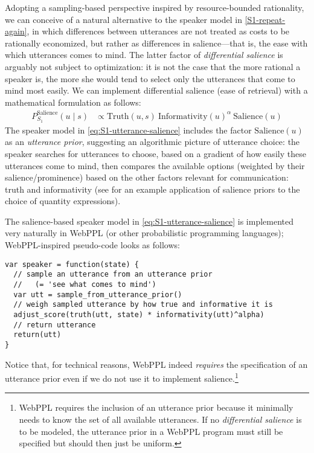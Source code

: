 \documentclass[10pt,letterpaper]{article}
\begin{document}
Adopting a sampling-based perspective inspired by resource-bounded rationality, we can conceive of a natural alternative to the speaker model in \eqref{S1-repeat-again}, in which differences between utterances are not treated as costs to be rationally economized, but rather as differences in salience---that is, the ease with which utterances comes to mind.
The latter factor of \emph{differential salience} is arguably not subject to optimization: it is not the case that the more rational a speaker is, the more she would tend to select only the utterances that come to mind most easily.
We can implement differential salience (ease of retrieval) with a mathematical formulation as follows:
%
\begin{align}
  \label{eq:S1-utterance-salience}
  P_{S_1}^{\text{Salience}}(u\mid s)   & \propto \text{Truth}(u,s) \ \text{Informativity}(u)^{\alpha} \ \text{Salience}(u)
\end{align}
%
The speaker model in \eqref{eq:S1-utterance-salience} includes the factor $\text{Salience}(u)$ as an \emph{utterance prior}, suggesting an algorithmic picture of utterance choice: the speaker searches for utterances to choose, based on a gradient of how easily these utterances come to mind, then compares the available options (weighted by their salience/prominence) based on the other factors relevant for communication: truth and informativity (see \cite{Tielvan-TielFranke2021:Probabilistic-p} for an example application of salience priors to the choice of quantity expressions).

The salience-based speaker model in \eqref{eq:S1-utterance-salience} is implemented very naturally in WebPPL (or other probabilistic programming languages); WebPPL-inspired pseudo-code looks as follows:
\begin{lstlisting}
var speaker = function(state) {
  // sample an utterance from an utterance prior
  //   (= 'see what comes to mind')
  var utt = sample_from_utterance_prior()
  // weigh sampled utterance by how true and informative it is
  adjust_score(truth(utt, state) * informativity(utt)^alpha)
  // return utterance
  return(utt)
}
\end{lstlisting}
Notice that, for technical reasons, WebPPL indeed \emph{requires} the specification of an utterance prior even if we do not use it to implement salience.\footnote{WebPPL requires the inclusion of an utterance prior because it minimally needs to know the set of all available utterances. If no \emph{differential salience} is to be modeled, the utterance prior in a WebPPL program must still be specified but should then just be uniform.}
\end{document}
